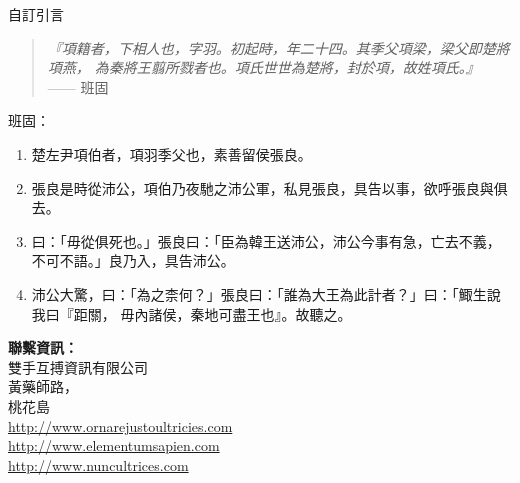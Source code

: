 \documentclass[10pt]{article} %
\begin{document}
\begin{minipage}[t]{.66\linewidth}
\hypertarget{quotation}{\large 自訂引言} %

\begin{quote}
\textsl{『項籍者，下相人也，字羽。初起時，年二十四。其季父項梁，梁父即楚將項燕，
為秦將王翦所戮者也。項氏世世為楚將，封於項，故姓項氏。』} —— \textrm{班固}
\end{quote}


\end{minipage}\hfill %
\begin{minipage}[t]{.30\linewidth} %


\begin{mdframed}[style=sidebar,frametitle={}] %


班固：

\begin{enumerate}
\item 楚左尹項伯者，項羽季父也，素善留侯張良。
\item 張良是時從沛公，項伯乃夜馳之沛公軍，私見張良，具告以事，欲呼張良與俱去。
\item 曰：「毋從俱死也。」張良曰：「臣為韓王送沛公，沛公今事有急，亡去不義，不可不語。」良乃入，具告沛公。
\item 沛公大驚，曰：「為之柰何？」張良曰：「誰為大王為此計者？」曰：「鯫生說我曰『距關，
毋內諸侯，秦地可盡王也』。故聽之。

\zhlipsum[10][name=trad]

\end{enumerate}

\BackToContents %

\end{mdframed}\hfill


\centering
\begin{minipage}[t]{.95\linewidth}
\textbf{聯繫資訊：}\\
雙手互搏資訊有限公司\\
黃藥師路，\\
桃花島\\
\href{http://www.example.com}{http://www.ornarejustoultricies.com}\\
\href{http://www.example.com}{http://www.elementumsapien.com}\\
\href{http://www.example.com}{http://www.nuncultrices.com}
\end{minipage}


\end{minipage} %

\end{document}

